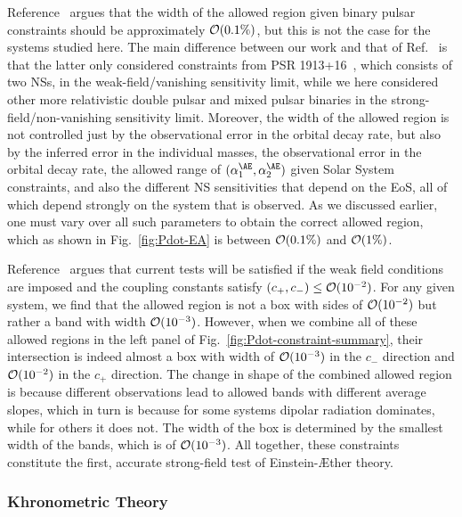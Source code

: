 \documentclass[prd,aps,twocolumn,nofootinbib,showpacs,superscriptaddress]{revtex4-1}
\begin{document}
Reference~\cite{Foster:2006az} argues that the width of the allowed region given binary pulsar constraints should be approximately ${\cal{O}}(0.1\%)$, but this is not the case for the systems studied here. The main difference between our work and that of Ref.~\cite{Foster:2006az} is that the latter only considered constraints from PSR 1913+16~\cite{Hulse:1974eb,Taylor:1982zz,Taylor:1989sw}, which consists of two NSs, in the weak-field/vanishing sensitivity limit, while we here considered other more relativistic double pulsar and mixed pulsar binaries in the strong-field/non-vanishing sensitivity limit. Moreover, the width of the allowed region is not controlled just by the observational error in the orbital decay rate, but also by the inferred error in the individual masses, the observational error in the orbital decay rate, the allowed range of $(\alpha_{1}^{\AE},\alpha_{2}^{\AE})$ given Solar System constraints, and also the different NS sensitivities that depend on the EoS, all of which depend strongly on 
the system that is observed. As we discussed earlier, one must vary over all such parameters to obtain the correct allowed region, which as shown in Fig.~\ref{fig:Pdot-EA} is between ${\cal{O}}(0.1\%)$ and ${\cal{O}}(1 \%)$. 

Reference~\cite{Foster:2007gr} argues that current tests will be satisfied if the weak field conditions are imposed and the coupling constants satisfy $(c_{+},c_{-}) \leq {\cal{O}}(10^{-2})$. For any given system, we find that the allowed region is not a box with sides of ${\cal{O}}(10^{-2})$ but rather a band with width ${\cal{O}}(10^{-3})$. However, when we combine all of these allowed regions in the left panel of Fig.~\ref{fig:Pdot-constraint-summary}, their intersection is indeed almost a box with width of ${\cal{O}}(10^{-3})$ in the $c_{-}$ direction and ${\cal{O}}(10^{-2})$ in the $c_{+}$ direction. The change in shape of the combined allowed region is because different observations lead to allowed bands with different average slopes, which in turn is because for some systems dipolar radiation dominates, while for others it does not. The width of the box is determined by the smallest width of the bands, which is of ${\cal{O}}(10^{-3})$. All together, these constraints constitute the first, accurate 
strong-field test of Einstein-\AE ther theory.

\subsubsection{Khronometric Theory}
\end{document}
